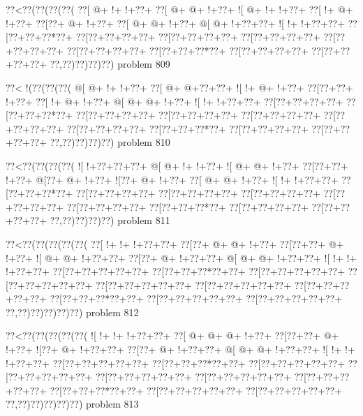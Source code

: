 \vbox{\vbox{\goo
\0??<\0??(\0??(\0??(\0??(
\0??[\- @+\- !+\- !+\0??+
\0??[\- @+\- @+\- !+\0??+
\- ![\- @+\- !+\- !+\0??+
\0??[\- !+\- @+\- !+\0??+
\0??[\0??+\- @+\- !+\0??+
\0??[\- @+\- @+\- !+\0??+
\- @[\- @+\- !+\0??+\0??+
\- ![\- !+\- !+\0??+\0??+
\0??[\0??+\0??+\0??*\0??+
\0??[\0??+\0??+\0??+\0??+
\0??[\0??+\0??+\0??+\0??+
\0??[\0??+\0??+\0??+\0??+
\0??[\0??+\0??+\0??+\0??+
\0??[\0??+\0??+\0??+\0??+
\0??[\0??+\0??+\0??*\0??+
\0??[\0??+\0??+\0??+\0??+
\0??[\0??+\0??+\0??+\0??+
\0??,\0??)\0??)\0??)\0??)
}
\hfil problem 809\hfil\break
}

\vbox{\vbox{\goo
\0??<\- !(\0??(\0??(\0??(
\- @[\- @+\- !+\- !+\0??+
\0??[\- @+\- @+\0??+\0??+
\- ![\- !+\- @+\- !+\0??+
\0??[\0??+\0??+\- !+\0??+
\0??[\- !+\- @+\- !+\0??+
\- @[\- @+\- @+\- !+\0??+
\- ![\- !+\- !+\0??+\0??+
\0??[\0??+\0??+\0??+\0??+
\0??[\0??+\0??+\0??*\0??+
\0??[\0??+\0??+\0??+\0??+
\0??[\0??+\0??+\0??+\0??+
\0??[\0??+\0??+\0??+\0??+
\0??[\0??+\0??+\0??+\0??+
\0??[\0??+\0??+\0??+\0??+
\0??[\0??+\0??+\0??*\0??+
\0??[\0??+\0??+\0??+\0??+
\0??[\0??+\0??+\0??+\0??+
\0??,\0??)\0??)\0??)\0??)
}
\hfil problem 810\hfil\break
}

\vbox{\vbox{\goo
\0??<\0??(\0??(\0??(\0??(
\- ![\- !+\0??+\0??+\0??+
\- @[\- @+\- !+\- !+\0??+
\- ![\- @+\- @+\- !+\0??+
\0??[\0??+\0??+\- !+\0??+
\- @[\0??+\- @+\- !+\0??+
\- ![\0??+\- @+\- !+\0??+
\0??[\- @+\- @+\- !+\0??+
\- ![\- !+\- !+\0??+\0??+
\0??[\0??+\0??+\0??*\0??+
\0??[\0??+\0??+\0??+\0??+
\0??[\0??+\0??+\0??+\0??+
\0??[\0??+\0??+\0??+\0??+
\0??[\0??+\0??+\0??+\0??+
\0??[\0??+\0??+\0??+\0??+
\0??[\0??+\0??+\0??*\0??+
\0??[\0??+\0??+\0??+\0??+
\0??[\0??+\0??+\0??+\0??+
\0??,\0??)\0??)\0??)\0??)
}
\hfil problem 811\hfil\break
}

\vbox{\vbox{\goo
\0??<\0??(\0??(\0??(\0??(\0??(
\0??[\- !+\- !+\- !+\0??+\0??+
\0??[\0??+\- @+\- @+\- !+\0??+
\0??[\0??+\0??+\- @+\- !+\0??+
\- ![\- @+\- @+\- !+\0??+\0??+
\0??[\0??+\- @+\- !+\0??+\0??+
\- @[\- @+\- @+\- !+\0??+\0??+
\- ![\- !+\- !+\- !+\0??+\0??+
\0??[\0??+\0??+\0??+\0??+\0??+
\0??[\0??+\0??+\0??*\0??+\0??+
\0??[\0??+\0??+\0??+\0??+\0??+
\0??[\0??+\0??+\0??+\0??+\0??+
\0??[\0??+\0??+\0??+\0??+\0??+
\0??[\0??+\0??+\0??+\0??+\0??+
\0??[\0??+\0??+\0??+\0??+\0??+
\0??[\0??+\0??+\0??*\0??+\0??+
\0??[\0??+\0??+\0??+\0??+\0??+
\0??[\0??+\0??+\0??+\0??+\0??+
\0??,\0??)\0??)\0??)\0??)\0??)
}
\hfil problem 812\hfil\break
}

\vbox{\vbox{\goo
\0??<\0??(\0??(\0??(\0??(\0??(
\- ![\- !+\- !+\- !+\0??+\0??+
\0??[\- @+\- @+\- @+\- !+\0??+
\0??[\0??+\0??+\- @+\- !+\0??+
\- ![\0??+\- @+\- !+\0??+\0??+
\0??[\0??+\- @+\- !+\0??+\0??+
\- @[\- @+\- @+\- !+\0??+\0??+
\- ![\- !+\- !+\- !+\0??+\0??+
\0??[\0??+\0??+\0??+\0??+\0??+
\0??[\0??+\0??+\0??*\0??+\0??+
\0??[\0??+\0??+\0??+\0??+\0??+
\0??[\0??+\0??+\0??+\0??+\0??+
\0??[\0??+\0??+\0??+\0??+\0??+
\0??[\0??+\0??+\0??+\0??+\0??+
\0??[\0??+\0??+\0??+\0??+\0??+
\0??[\0??+\0??+\0??*\0??+\0??+
\0??[\0??+\0??+\0??+\0??+\0??+
\0??[\0??+\0??+\0??+\0??+\0??+
\0??,\0??)\0??)\0??)\0??)\0??)
}
\hfil problem 813\hfil\break
}

